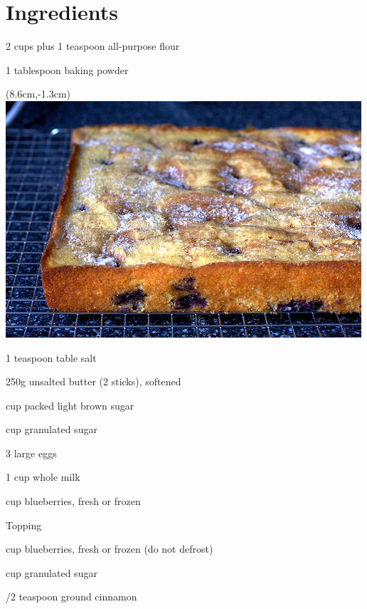 
\bigskip
\section*{Ingredients}

\begin{ingredients-list}
	\item 2 cups plus 1 teaspoon all-purpose flour
	\item 1 tablespoon baking powder
		\begin{textblock*}{8cm}(8.6cm,-1.3cm) %
			\includegraphics[scale=0.43]{./img/blueberry-boy-bait.jpg}
		\end{textblock*}
	\item 1 teaspoon table salt
	\item 250g unsalted butter (2 sticks), softened
	\item {} cup packed light brown sugar
	\item {} cup granulated sugar
	\item 3 large eggs
	\item 1 cup whole milk
\item {} cup blueberries, fresh or frozen
\end{ingredients-list}

Topping
\begin{ingredients-list}
	\item {} cup blueberries, fresh or frozen (do not defrost)
	\item {} cup granulated sugar
	\item {}/{2} teaspoon ground cinnamon
\end{ingredients-list}

